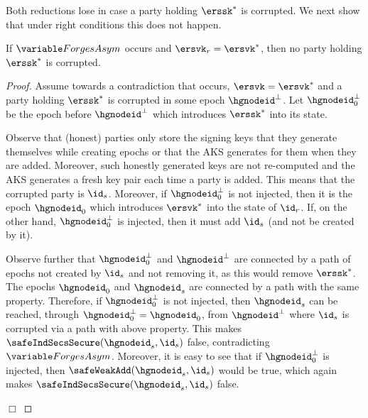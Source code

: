 Both reductions lose in case a party holding $\erssk^*$ is corrupted. We next show that under right conditions this does not happen.
\begin{claim}
  If $\forgesa$ occurs and $\ersvk_r=\ersvk^*$, then no party holding $\erssk^*$ is corrupted.
\end{claim}
\begin{proof}
  Assume towards a contradiction that \forgesa occurs, $\ersvk = \ersvk^*$ and a party holding $\erssk^*$ is corrupted in some epoch $\hgnodeid^\bot$. Let $\hgnodeid_0^\bot$ be the epoch before $\hgnodeid^\bot$ which introduces $\erssk^*$ into its state.

  Observe that (honest) parties only store the signing keys that they generate themselves while creating epochs or that the AKS generates for them when they are added. Moreover, such honestly generated keys are not re-computed and the AKS generates a fresh key pair each time a party is added.
  This means that the corrupted party is $\id_s$. Moreover, if $\hgnodeid_0^\bot$ is not injected, then it is the epoch $\hgnodeid_0$ which introduces $\ersvk^*$ into the state of $\id_r$. If, on the other hand, $\hgnodeid_0^\bot$ is injected, then it must add $\id_s$ (and not be created by it).

  Observe further that $\hgnodeid_0^\bot$ and $\hgnodeid^\bot$ are connected by a path of epochs not created by $\id_s$ and not removing it, as this would remove $\erssk^*$. The epochs $\hgnodeid_0$ and $\hgnodeid_s$ are connected by a path with the same property. Therefore, if $\hgnodeid_0^\bot$ is not injected, then $\hgnodeid_s$ can be reached, through $\hgnodeid_0^\bot=\hgnodeid_0$, from $\hgnodeid^\bot$ where $\id_s$ is corrupted via a path with above property. This makes $\safeIndSecsSecure(\hgnodeid_s, \id_s)$ false, contradicting $\forgesa$.
  Moreover, it is easy to see that if $\hgnodeid_0^\bot$ is injected, then $\safeWeakAdd(\hgnodeid_s,\id_s)$ would be true, which again makes $\safeIndSecsSecure(\hgnodeid_s, \id_s)$ false.
\strut\hfill$\Box$\end{proof}


